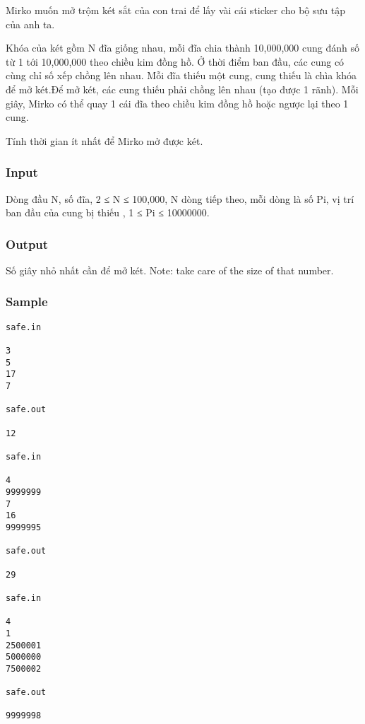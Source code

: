 



   Mirko muốn mở trộm két sắt của con trai để lấy vài cái sticker cho  bộ sưu tập của anh ta.  

   Khóa của két gồm N đĩa giống nhau, mỗi đĩa chia thành 10,000,000 cung đánh số từ 1 tới 10,000,000 theo chiều kim đồng hồ. Ở thời điểm ban  đầu, các cung có cùng chỉ số xếp chồng lên nhau. Mỗi đĩa thiếu một cung, cung thiếu là chìa khóa để mở két.Để mở két, các cung thiếu phải chồng lên nhau (tạo được 1 rãnh). Mỗi giây, Mirko có thể quay 1 cái đĩa theo chiều kim đồng hồ hoặc ngược lại theo 1 cung.  

   Tính thời gian ít nhất để Mirko mở được két.  

\subsubsection{   Input  }

   Dòng đầu N, số đĩa, 2 ≤ N ≤ 100,000,  N dòng tiếp theo, mỗi dòng là số Pi, vị trí ban đầu của cung bị thiếu , 1 ≤ Pi ≤ 10000000.  

\subsubsection{   Output  }

   Số giây nhỏ nhất cần để mở két. Note: take care of the size of that number.  

\subsubsection{   Sample  }
\begin{verbatim}
safe.in 
 
3 
5 
17 
7 
 
safe.out 
 
12 

safe.in 
 
4 
9999999 
7 
16 
9999995 
 
safe.out 
 
29

safe.in 
 
4 
1 
2500001 
5000000 
7500002 
 
safe.out 
 
9999998 

\end{verbatim}
